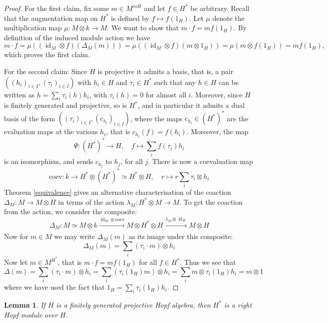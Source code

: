 \documentclass{article}
\theoremstyle{plain}
\newtheorem{Lemma}[Th]{Lemma}
\theoremstyle{definition}
\DeclareMathOperator{\id}{id}
\begin{document}
\begin{proof}
For the first claim, fix some $m\in M^{\text{co}H}$ and let $f\in H^*$ be arbitrary. Recall that the augmentation map on $H^*$ is defined by $f\mapsto f(1_H)$. Let $\mu$ denote the multiplication map $\mu\colon M\otimes k \to M$. We want to show that $m\cdot f =m f(1_H)$. By definition of the induced module action we have 
\[
m\cdot f=\mu((\id_M\otimes f)(\Delta_M(m)))=\mu((\id_M\otimes f)(m\otimes 1_H))=\mu(m\otimes f(1_H))=mf(1_H),
\]
which proves the first claim.

For the second claim: Since $H$ is projective it admits a basis, that is, a pair $((h_i)_{i\in I}, (\tau_i)_{i\in I})$ with $h_i\in H$ and $\tau_i\in H^*$ such that any $h\in H$ can be written as $h=\sum_i \tau_i(h)h_i$, with $\tau_i(h)=0$ for almost all $i$. Moreover, since $H$ is finitely generated and projective, so is $H^*$, and in particular it admits a dual basis of the form $((\tau_i)_{i\in I}, (c_{h_i})_{i\in I})$, where the maps $c_{h_i} \in (H^*)^*$ are the evaluation maps at the various $h_i$, that is $c_{h_i}(f)=f(h_i)$. Moreover, the map 
\[
\Psi\colon  (H^*)^*\to H, \quad f \mapsto \sum_i f(\tau_i)h_i
\]
 is an isomorphism, and sends $c_{h_j}$ to $h_j$, for all $j$. There is now a coevaluation map
 \[
 \text{coev}:k\to H^*\otimes (H^*)^* \simeq H^* \otimes H, \quad r \mapsto r\sum_i \tau_i\otimes h_i
 \]
 Theorem \ref{equivalence} gives an alternative characterisation of the coaction $\Delta_M\colon M\to M\otimes H$ in terms of the action $\lambda_M\colon H^*\otimes M\to M$. To get the coaction from the action, we consider the composite: 
 \[
\Delta_M\colon  M\simeq M\otimes k\xrightarrow[]{\id_M\otimes \text{coev}} M \otimes H^*\otimes H \xrightarrow[]{\lambda_M \otimes \id_H} M\otimes H
 \]
Now for $m\in M$ we may write $\Delta_M(m)$ as its image under this composite: 
\[\Delta_M(m)=\sum_i (\tau_i \cdot m) \otimes h_i\]
Now let $m\in M^{H^*}$, that is $m \cdot f=mf(1_H)$ for all $f\in H^*$. Thus we see that 
\[
\Delta(m)=\sum_i (\tau_i \cdot m) \otimes h_i = \sum_i (\tau_i(1_H)m) \otimes h_i =\sum_i m \otimes \tau_i(1_H) h_i =m\otimes 1
\]
where we have used the fact that $1_H=\sum_i \tau_i(1_H)h_i$.
\end{proof}







\begin{Lemma}\label{H* is a right Hopf Module}
    If $H$ is a finitely generated projective Hopf algebra, then $H^*$ is a right Hopf module over $H$.
\end{Lemma}
\end{document}
